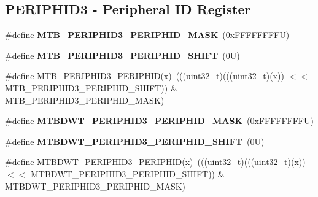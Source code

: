 \subsection*{P\+E\+R\+I\+P\+H\+I\+D3 -\/ Peripheral ID Register}
\begin{DoxyCompactItemize}
\item 
\mbox{\label{group___m_t_b___register___masks_ga2edf0e76f268ede3c05ce96431268246}} 
\#define {\bfseries M\+T\+B\+\_\+\+P\+E\+R\+I\+P\+H\+I\+D3\+\_\+\+P\+E\+R\+I\+P\+H\+I\+D\+\_\+\+M\+A\+SK}~(0x\+F\+F\+F\+F\+F\+F\+F\+F\+U)
\item 
\mbox{\label{group___m_t_b___register___masks_ga8299dd1e5891689b801dc610227db07c}} 
\#define {\bfseries M\+T\+B\+\_\+\+P\+E\+R\+I\+P\+H\+I\+D3\+\_\+\+P\+E\+R\+I\+P\+H\+I\+D\+\_\+\+S\+H\+I\+FT}~(0\+U)
\item 
\#define \mbox{\hyperlink{group___m_t_b___register___masks_gad84611280cd8d231fc40753d1c1d9fba}{M\+T\+B\+\_\+\+P\+E\+R\+I\+P\+H\+I\+D3\+\_\+\+P\+E\+R\+I\+P\+H\+ID}}(x)~(((uint32\+\_\+t)(((uint32\+\_\+t)(x)) $<$$<$ M\+T\+B\+\_\+\+P\+E\+R\+I\+P\+H\+I\+D3\+\_\+\+P\+E\+R\+I\+P\+H\+I\+D\+\_\+\+S\+H\+I\+FT)) \& M\+T\+B\+\_\+\+P\+E\+R\+I\+P\+H\+I\+D3\+\_\+\+P\+E\+R\+I\+P\+H\+I\+D\+\_\+\+M\+A\+SK)
\item 
\mbox{\label{group___m_t_b___register___masks_ga9323eb59d9a1018ebae28a7626bbd61b}} 
\#define {\bfseries M\+T\+B\+D\+W\+T\+\_\+\+P\+E\+R\+I\+P\+H\+I\+D3\+\_\+\+P\+E\+R\+I\+P\+H\+I\+D\+\_\+\+M\+A\+SK}~(0x\+F\+F\+F\+F\+F\+F\+F\+F\+U)
\item 
\mbox{\label{group___m_t_b___register___masks_ga9a4e4e9d8cde4f95dd05336786bb9ad3}} 
\#define {\bfseries M\+T\+B\+D\+W\+T\+\_\+\+P\+E\+R\+I\+P\+H\+I\+D3\+\_\+\+P\+E\+R\+I\+P\+H\+I\+D\+\_\+\+S\+H\+I\+FT}~(0\+U)
\item 
\#define \mbox{\hyperlink{group___m_t_b___register___masks_ga4ff280515681ada06bd251d8c9847c25}{M\+T\+B\+D\+W\+T\+\_\+\+P\+E\+R\+I\+P\+H\+I\+D3\+\_\+\+P\+E\+R\+I\+P\+H\+ID}}(x)~(((uint32\+\_\+t)(((uint32\+\_\+t)(x)) $<$$<$ M\+T\+B\+D\+W\+T\+\_\+\+P\+E\+R\+I\+P\+H\+I\+D3\+\_\+\+P\+E\+R\+I\+P\+H\+I\+D\+\_\+\+S\+H\+I\+FT)) \& M\+T\+B\+D\+W\+T\+\_\+\+P\+E\+R\+I\+P\+H\+I\+D3\+\_\+\+P\+E\+R\+I\+P\+H\+I\+D\+\_\+\+M\+A\+SK)
\item 

\end{DoxyCompactItemize}
